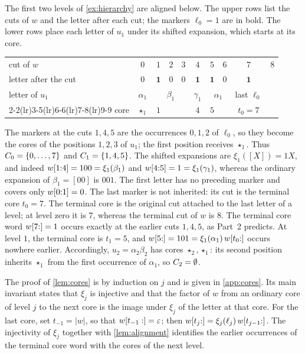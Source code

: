 The first two levels of \cref{ex:hierarchy} are aligned below. The upper rows
list the cuts of $w$ and the letter after each cut; the markers $\ell_0=1$ are in
bold. The lower rows place each letter of $u_1$ under its shifted expansion,
which starts at its core.
\begin{center}
\small
\begin{tabular}{@{}l*{9}{c}@{}}
\toprule
cut of $w$ & $0$ & $1$ & $2$ & $3$ & $4$ & $5$ & $6$ & $7$ & $8$\\
letter after the cut & $0$ & $\mathbf 1$ & $0$ & $0$ & $\mathbf 1$ & $\mathbf 1$ & $0$ & $\mathbf 1$ & \\
\midrule
letter of $u_1$ & $\alpha_1$ & \multicolumn{3}{c}{$\beta_1$} & $\gamma_1$
  & \multicolumn{2}{c}{$\alpha_1$} & last $\ell_0$ & \\
\cmidrule(lr){2-2}\cmidrule(lr){3-5}\cmidrule(lr){6-6}\cmidrule(lr){7-8}\cmidrule(lr){9-9}
core & $\star_1$ & $1$ & & & $4$ & $5$ & & $t_0=7$ & \\
\bottomrule
\end{tabular}
\end{center}
The markers at the cuts $1,4,5$ are the occurrences $0,1,2$ of $\ell_0$, so they
become the cores of the positions $1,2,3$ of $u_1$; the first position receives
$\star_1$. Thus $C_0=\{0,\dots,7\}$ and $C_1=\{1,4,5\}$. The shifted
expansions are $\xi_1([X])=1X$, and indeed $w[1{:}4]=100=\xi_1(\beta_1)$
and $w[4{:}5]=1=\xi_1(\gamma_1)$, whereas the ordinary expansion of
$\beta_1=[00]$ is $001$. The first letter has no preceding marker and covers only
$w[0{:}1]=0$. The last marker is not inherited: its cut is the terminal core
$t_0=7$. The terminal core is the original cut attached to the last letter of a
level; at level zero it is $7$, whereas the terminal cut of $w$ is $8$. The terminal
core word $w[7{:}]=1$ occurs exactly at the earlier cuts $1,4,5$, as Part~2
predicts. At level $1$, the terminal core is $t_1=5$, and
$w[5{:}]=101=\xi_1(\alpha_1)\,w[t_0{:}]$ occurs nowhere earlier. Accordingly,
$u_2=\alpha_2\beta_2$ has cores $\star_2,\star_1$: its second position inherits
$\star_1$ from the first occurrence of $\alpha_1$, so $C_2=\emptyset$.

The proof of \cref{lem:cores} is by induction on $j$ and is given in \cref{app:cores}. Its
main invariant states that $\xi_j$ is injective and that the factor of $w$ from an
ordinary core of level $j$ to the next core is the image under $\xi_j$ of the letter at
that core. For the last core, set $t_{-1}=|w|$, so that $w[t_{-1}:]=\varepsilon$; then
$w[t_j{:}] = \xi_j(\ell_j)\,w[t_{j-1}{:}]$. The injectivity of $\xi_j$
together with \cref{lem:alignment} identifies the earlier occurrences of the terminal core
word with the cores of the next level.

